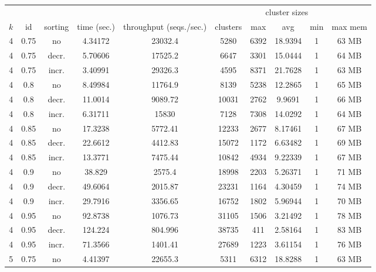 \begingroup
\setlength{\LTleft}{-20cm plus -1fill}
\setlength{\LTright}{\LTleft}
\begin{longtable}{c|c|c|c|c|c|c|c|c|c}
  & & & & & &\multicolumn{3}{c|}{cluster sizes} & \\
  $k$ & id & sorting & time (sec.) & throughput (seqs./sec.) & clusters & max & avg & min & max mem \\
  \hline \hline
  4   &  0.75  & no    & 4.34172  &  23032.4  &  5280   &  6392  &  18.9394  &  1  &  63  MB \\
  4   &  0.75  & decr. & 5.70606  &  17525.2  &  6647   &  3301  &  15.0444  &  1  &  64  MB \\
  4   &  0.75  & incr. & 3.40991  &  29326.3  &  4595   &  8371  &  21.7628  &  1  &  63  MB \\
  \hline
  4   &  0.8   & no    & 8.49984  &  11764.9  &  8139   &  5238  &  12.2865  &  1  &  65  MB \\
  4   &  0.8   & decr. & 11.0014  &  9089.72  &  10031  &  2762  &  9.9691   &  1  &  66  MB \\
  4   &  0.8   & incr. & 6.31711  &  15830    &  7128   &  7308  &  14.0292  &  1  &  64  MB \\
  \hline
  4   &  0.85  & no    & 17.3238  &  5772.41  &  12233  &  2677  &  8.17461  &  1  &  67  MB \\
  4   &  0.85  & decr. & 22.6612  &  4412.83  &  15072  &  1172  &  6.63482  &  1  &  69  MB \\
  4   &  0.85  & incr. & 13.3771  &  7475.44  &  10842  &  4934  &  9.22339  &  1  &  67  MB \\
  \hline
  4   &  0.9   & no    & 38.829   &  2575.4   &  18998  &  2203  &  5.26371  &  1  &  71  MB \\
  4   &  0.9   & decr. & 49.6064  &  2015.87  &  23231  &  1164  &  4.30459  &  1  &  74  MB \\
  4   &  0.9   & incr. & 29.7916  &  3356.65  &  16752  &  1802  &  5.96944  &  1  &  70  MB \\
  \hline
  4   &  0.95  & no    & 92.8738  &  1076.73  &  31105  &  1506  &  3.21492  &  1  &  78  MB \\
  4   &  0.95  & decr. & 124.224  &  804.996  &  38735  &  411   &  2.58164  &  1  &  83  MB \\
  4   &  0.95  & incr. & 71.3566  &  1401.41  &  27689  &  1223  &  3.61154  &  1  &  76  MB \\
  \hline
  5   &  0.75  & no    & 4.41397  &  22655.3  &  5311   &  6312  &  18.8288  &  1  &  63  MB \\

\end{longtable}

